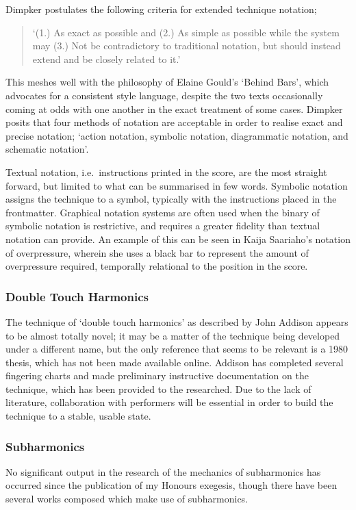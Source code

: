 Dimpker postulates the following criteria for extended technique notation; \begin{quote}
    `(1.) As exact as possible and (2.) As simple as possible while the system may (3.) Not be contradictory to
traditional notation, but should instead extend and be closely related to it.'\autocite[3]{dimpkerExtendedNotationDepiction2012}
\end{quote}
This meshes well with the philosophy of Elaine Gould's `Behind Bars', which advocates for a consistent style language, despite the two texts occasionally coming at odds with one another in the exact treatment of some cases.\autocite[120--121, 61]{dimpkerExtendedNotationDepiction2012,gouldBars2011}
Dimpker posits that four methods of notation are acceptable in order to realise exact and precise notation; `action notation, symbolic notation, diagrammatic notation, and schematic notation'.\autocite[33]{dimpkerExtendedNotationDepiction2012}

Textual notation, i.e.\ instructions printed in the score, are the most straight forward, but limited to what can be summarised in few words.
Symbolic notation assigns the technique to a symbol, typically with the instructions placed in the frontmatter.
Graphical notation systems are often used when the binary of symbolic notation is restrictive, and requires a greater fidelity than textual notation can provide. 
An example of this can be seen in Kaija Saariaho's notation of overpressure, wherein she uses a black bar to represent the amount of overpressure required, temporally relational to the position in the score.\autocite{TODO:saariaho citation}

\subsubsection{Double Touch Harmonics}
The technique of `double touch harmonics' as described by John Addison appears to be almost totally novel; it may be a matter of the technique being developed under a different name, but the only reference that seems to be relevant is a 1980 thesis, which has not been made available online.\autocite{woodrichMultinodalPerformanceTechnique1980}
Addison has completed several fingering charts and made preliminary instructive documentation on the technique, which has been provided to the researched.
Due to the lack of literature, collaboration with performers will be essential in order to build the technique to a stable, usable state.

\subsubsection{Subharmonics}
No significant output in the research of the mechanics of subharmonics has occurred since the publication of my Honours exegesis, though there have been several works composed which make use of subharmonics.\

